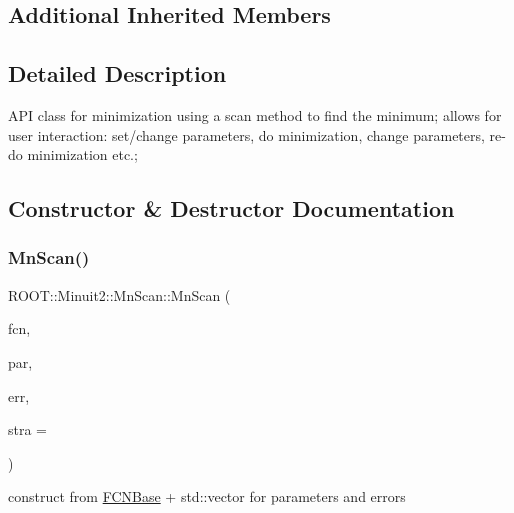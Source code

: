 \subsection*{Additional Inherited Members}


\subsection{Detailed Description}
A\+PI class for minimization using a scan method to find the minimum; allows for user interaction\+: set/change parameters, do minimization, change parameters, re-\/do minimization etc.; 

\subsection{Constructor \& Destructor Documentation}
\mbox{\label{classROOT_1_1Minuit2_1_1MnScan_a377822c78ab78d995bc0a710dbc0c426}} 
\subsubsection{\texorpdfstring{MnScan()}{MnScan()}\hspace{0.1cm}{\footnotesize\ttfamily [1/21]}}
{\footnotesize\ttfamily R\+O\+O\+T\+::\+Minuit2\+::\+Mn\+Scan\+::\+Mn\+Scan (\begin{DoxyParamCaption}\item[{const \mbox{\hyperlink{classROOT_1_1Minuit2_1_1FCNBase}{F\+C\+N\+Base}} \&}]{fcn,  }\item[{const std\+::vector$<$ double $>$ \&}]{par,  }\item[{const std\+::vector$<$ double $>$ \&}]{err,  }\item[{unsigned int}]{stra = {} }\end{DoxyParamCaption})\hspace{0.3cm}{\ttfamily [inline]}}



construct from \mbox{\hyperlink{classROOT_1_1Minuit2_1_1FCNBase}{F\+C\+N\+Base}} + std\+::vector for parameters and errors 

\mbox{\label{classROOT_1_1Minuit2_1_1MnScan_a293bc22ed5bd5755f4c1d7256c1936ab}} 
